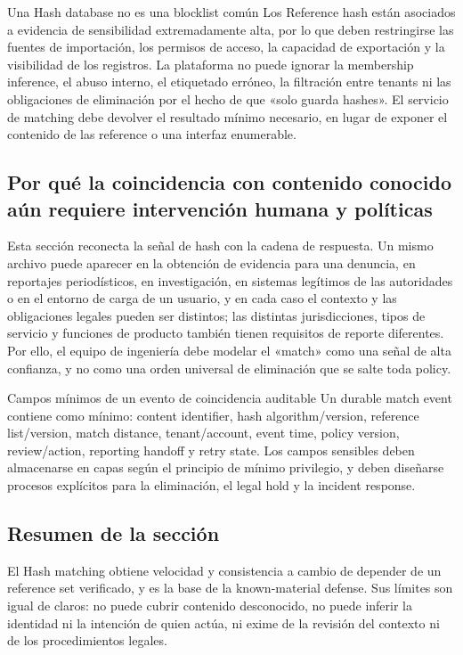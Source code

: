 \begin{warningbox}{Una Hash database no es una blocklist común}
Los Reference hash están asociados a evidencia de sensibilidad extremadamente alta, por lo que deben restringirse las fuentes de importación, los permisos de acceso, la capacidad de exportación y la visibilidad de los registros. La plataforma no puede ignorar la membership inference, el abuso interno, el etiquetado erróneo, la filtración entre tenants ni las obligaciones de eliminación por el hecho de que «solo guarda hashes». El servicio de matching debe devolver el resultado mínimo necesario, en lugar de exponer el contenido de las reference o una interfaz enumerable.
\end{warningbox}

\subsection{Por qué la coincidencia con contenido conocido aún requiere intervención humana y políticas}

Esta sección reconecta la señal de hash con la cadena de respuesta. Un mismo archivo puede aparecer en la obtención de evidencia para una denuncia, en reportajes periodísticos, en investigación, en sistemas legítimos de las autoridades o en el entorno de carga de un usuario, y en cada caso el contexto y las obligaciones legales pueden ser distintos; las distintas jurisdicciones, tipos de servicio y funciones de producto también tienen requisitos de reporte diferentes. Por ello, el equipo de ingeniería debe modelar el «match» como una señal de alta confianza, y no como una orden universal de eliminación que se salte toda policy.

\begin{importantbox}{Campos mínimos de un evento de coincidencia auditable}
Un durable match event contiene como mínimo: content identifier, hash algorithm/version, reference list/version, match distance, tenant/account, event time, policy version, review/action, reporting handoff y retry state. Los campos sensibles deben almacenarse en capas según el principio de mínimo privilegio, y deben diseñarse procesos explícitos para la eliminación, el legal hold y la incident response.
\end{importantbox}

\subsection{Resumen de la sección}

El Hash matching obtiene velocidad y consistencia a cambio de depender de un reference set verificado, y es la base de la known-material defense. Sus límites son igual de claros: no puede cubrir contenido desconocido, no puede inferir la identidad ni la intención de quien actúa, ni exime de la revisión del contexto ni de los procedimientos legales.
